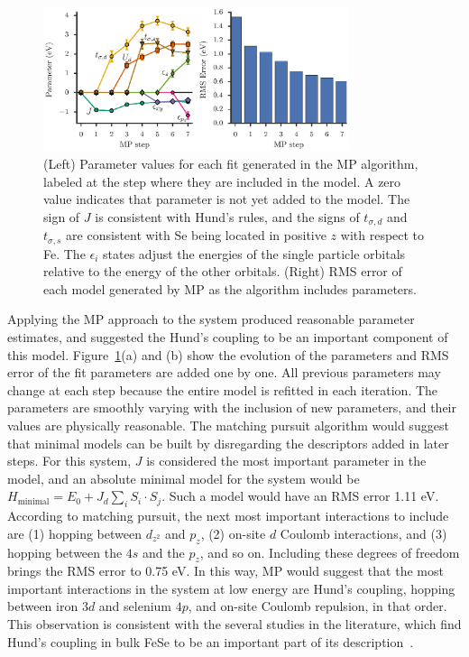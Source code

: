 \begin{figure}
  \centering
  \includegraphics[width=0.8\textwidth]{./Figures/fese.eps}
  \caption{
    \label{fig:fese} 
    (Left) Parameter values for each fit generated in the MP algorithm, labeled at the step where they are included in the model. 
    A zero value indicates that parameter is not yet added to the model.
    The sign of $J$ is consistent with Hund's rules, and the signs of $t_{\sigma,d}$ and $t_{\sigma,s}$ are consistent with Se being located in positive $z$ with respect to Fe. 
    The $\epsilon_i$ states adjust the energies of the single particle orbitals relative to the energy of the other orbitals.
    (Right) RMS error of each model generated by MP as the algorithm includes parameters. 
  }
\end{figure}

Applying the MP approach to the system produced reasonable parameter estimates, and suggested the Hund's coupling to be an important component of this model.
Figure~\ref{fig:fese}(a) and (b) show the evolution of the parameters and RMS error of the fit parameters are added one by one.
All previous parameters may change at each step because the entire model is refitted in each iteration.
The parameters are smoothly varying with the inclusion of new parameters, and their values are physically reasonable.
The matching pursuit algorithm would suggest that minimal models can be built by disregarding the descriptors added in later steps.
For this system, $J$ is considered the most important parameter in the model, and an absolute minimal model for the system would be $H_\text{minimal} = E_0 + J_d \sum_i S_i \cdot S_j$. 
Such a model would have an RMS error 1.11 eV. 
According to matching pursuit, the next most important interactions to include are (1) hopping between $d_{z^2}$ and $p_z$, (2) on-site $d$ Coulomb interactions, and (3) hopping between the $4s$ and the $p_z$, and so on. 
Including these degrees of freedom brings the RMS error to 0.75 eV. 
In this way, MP would suggest  that the most important interactions in the system at low energy are Hund's coupling, hopping between iron $3d$ and selenium $4p$, and on-site Coulomb repulsion, in that order.
This observation is consistent with the several studies in the literature, which find Hund's coupling in bulk FeSe to be an important part of its description~\cite{demedici_hunds_2011,de_medici_janus-faced_2011,georges_strong_2013,busemeyer_competing_2016}.


